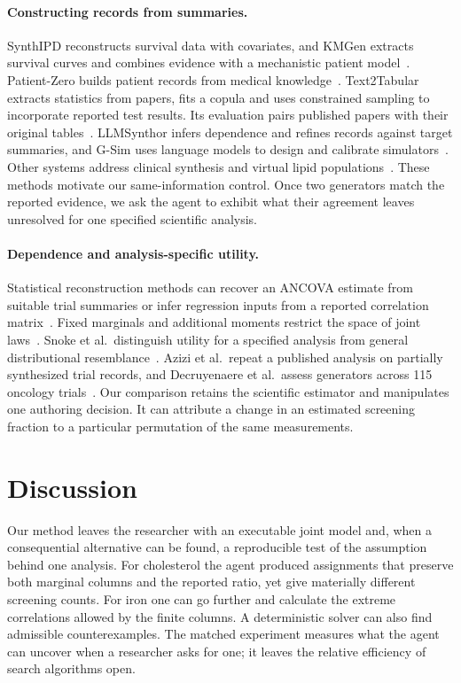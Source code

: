 \documentclass[sigconf,anonymous,review]{acmart}
\begin{document}
\paragraph{Constructing records from summaries.}
SynthIPD reconstructs survival data with covariates, and KMGen extracts survival curves and combines evidence with a mechanistic patient model~\cite{synthipd,kmgen}. Patient-Zero builds patient records from medical knowledge~\cite{patientzero}. Text2Tabular extracts statistics from papers, fits a copula and uses constrained sampling to incorporate reported test results. Its evaluation pairs published papers with their original tables~\cite{gottal2026text2tabular}. LLMSynthor infers dependence and refines records against target summaries, and G-Sim uses language models to design and calibrate simulators~\cite{llmsynthor,gsim}. Other systems address clinical synthesis and virtual lipid populations~\cite{synthcraft,allenlipid,fasseeh}. These methods motivate our same-information control. Once two generators match the reported evidence, we ask the agent to exhibit what their agreement leaves unresolved for one specified scientific analysis.

\paragraph{Dependence and analysis-specific utility.}
Statistical reconstruction methods can recover an ANCOVA estimate from suitable trial summaries or infer regression inputs from a reported correlation matrix~\cite{pseudoancova,bonofiglio}. Fixed marginals and additional moments restrict the space of joint laws~\cite{bounds,makarov,zaev}. Snoke et al.\ distinguish utility for a specified analysis from general distributional resemblance~\cite{specificutility}. Azizi et al.\ repeat a published analysis on partially synthesized trial records, and Decruyenaere et al.\ assess generators across 115 oncology trials~\cite{azizi,oncology115}. Our comparison retains the scientific estimator and manipulates one authoring decision. It can attribute a change in an estimated screening fraction to a particular permutation of the same measurements.

\section{Discussion}
Our method leaves the researcher with an executable joint model and, when a consequential alternative can be found, a reproducible test of the assumption behind one analysis. For cholesterol the agent produced assignments that preserve both marginal columns and the reported ratio, yet give materially different screening counts. For iron one can go further and calculate the extreme correlations allowed by the finite columns. A deterministic solver can also find admissible counterexamples. The matched experiment measures what the agent can uncover when a researcher asks for one; it leaves the relative efficiency of search algorithms open.
\end{document}

